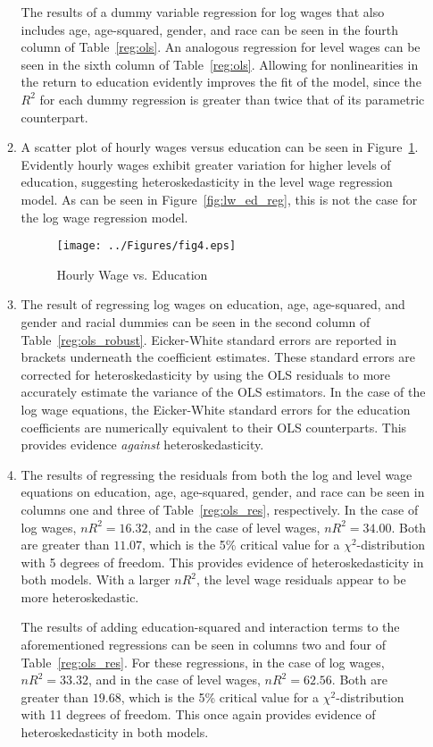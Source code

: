 \documentclass{article}
\begin{document}
\begin{enumerate}
\begin{enumerate}
The results of a dummy variable regression for log wages that also includes age, age-squared, gender, and race can be seen in the fourth column of Table~\ref{reg:ols}. An analogous regression for level wages can be seen in the sixth column of Table~\ref{reg:ols}. Allowing for nonlinearities in the return to education evidently improves the fit of the model, since the $R^{2}$ for each dummy regression is greater than twice that of its parametric counterpart.

\item A scatter plot of hourly wages versus education can be seen in Figure~\ref{fig:hw_ed}. Evidently hourly wages exhibit greater variation for higher levels of education, suggesting heteroskedasticity in the level wage regression model. As can be seen in Figure~\ref{fig:lw_ed_reg}, this is not the case for the log wage regression model.

\begin{figure}[htbp!]
\centering
\texttt{[image: ../Figures/fig4.eps]}
\caption{Hourly Wage vs. Education}
\label{fig:hw_ed}
\end{figure}

\item The result of regressing log wages on education, age, age-squared, and gender and racial dummies can be seen in the second column of Table~\ref{reg:ols_robust}. Eicker-White standard errors are reported in brackets underneath the coefficient estimates. These standard errors are corrected for heteroskedasticity by using the OLS residuals to more accurately estimate the variance of the OLS estimators. In the case of the log wage equations, the Eicker-White standard errors for the education coefficients are numerically equivalent to their OLS counterparts. This provides evidence \emph{against} heteroskedasticity.

\item The results of regressing the residuals from both the log and level wage equations on education, age, age-squared, gender, and race can be seen in columns one and three of Table~\ref{reg:ols_res}, respectively. In the case of log wages, $nR^{2}=16.32$, and in the case of level wages, $n{R}^2=34.00$. Both are greater than $11.07$, which is the 5\% critical value for a $\chi^{2}$-distribution with 5 degrees of freedom. This provides evidence of heteroskedasticity in both models. With a larger $nR^{2}$, the level wage residuals appear to be more heteroskedastic.

The results of adding education-squared and interaction terms to the aforementioned regressions can be seen in columns two and four of Table~\ref{reg:ols_res}. For these regressions, in the case of log wages, $nR^{2}=33.32$, and in the case of level wages, $nR^{2}=62.56$. Both are greater than $19.68$, which is the 5\% critical value for a $\chi^{2}$-distribution with 11 degrees of freedom. This once again provides evidence of heteroskedasticity in both models.


\end{enumerate}
\end{enumerate}
\end{document}
